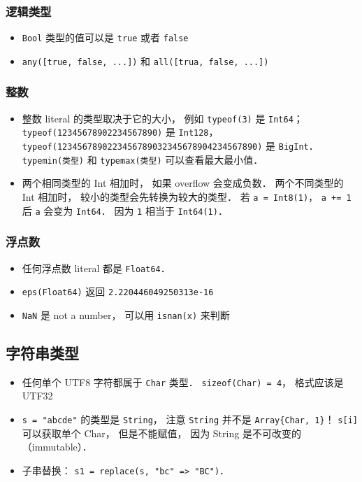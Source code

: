 \subsubsection{逻辑类型}
\begin{itemize}
\item \verb|Bool| 类型的值可以是 \verb|true| 或者 \verb|false|
\item \verb|any([true, false, ...])| 和 \verb|all([trua, false, ...])|
\end{itemize}

\subsubsection{整数}
\begin{itemize}
\item 整数 literal 的类型取决于它的大小， 例如 \verb|typeof(3)| 是 \verb|Int64|； \verb|typeof(12345678902234567890)| 是 \verb|Int128|， \verb|typeof(1234567890223456789032345678904234567890)| 是 \verb|BigInt|． \verb|typemin(类型)| 和 \verb|typemax(类型)| 可以查看最大最小值．
\item 两个相同类型的 Int 相加时， 如果 overflow 会变成负数． 两个不同类型的 Int 相加时， 较小的类型会先转换为较大的类型． 若 \verb|a = Int8(1)|， \verb|a += 1| 后 \verb|a| 会变为 \verb|Int64|． 因为 \verb|1| 相当于 \verb|Int64(1)|．
\end{itemize}

\subsubsection{浮点数}
\begin{itemize}
\item 任何浮点数 literal 都是 \verb|Float64|．
\item \verb|eps(Float64)| 返回 \verb|2.220446049250313e-16|
\item \verb|NaN| 是 not a number， 可以用 \verb|isnan(x)| 来判断
\end{itemize}

\subsection{字符串类型}
\begin{itemize}
\item 任何单个 UTF8 字符都属于 \verb|Char| 类型． \verb|sizeof(Char) = 4|， 格式应该是 UTF32
\item \verb|s = "abcde"| 的类型是 \verb|String|， 注意 \verb|String| 并不是 \verb|Array{Char, 1}|！ \verb|s[i]| 可以获取单个 Char， 但是不能赋值， 因为 String 是不可改变的（immutable）．
\item 子串替换： \verb|s1 = replace(s, "bc" => "BC")|．
\end{itemize}


